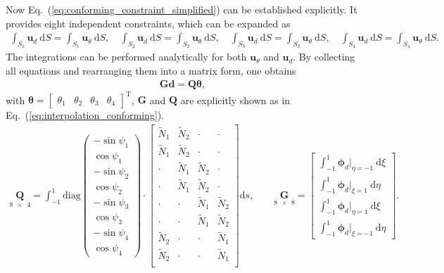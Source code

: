 \documentclass[3p,sort&compress,review,11pt]{elsarticle}
\newcommand*{\md}[1]{\mathrm{d}#1}
\newcommand*{\mT}{\mathrm{T}}
\newcommand*{\eqsref}[1]{Eq.~(\ref{#1})}
\begin{document}
Now \eqsref{eq:conforming_constraint_simplified} can be established explicitly. It provides eight independent constraints, which can be expanded as
\begin{gather*}
\int_{S_1}\mathbold{u}_d~\md{S}=\int_{S_1}\mathbold{u}_\theta~\md{S},\quad
\int_{S_2}\mathbold{u}_d~\md{S}=\int_{S_2}\mathbold{u}_\theta~\md{S},\quad
\int_{S_3}\mathbold{u}_d~\md{S}=\int_{S_3}\mathbold{u}_\theta~\md{S},\quad
\int_{S_4}\mathbold{u}_d~\md{S}=\int_{S_4}\mathbold{u}_\theta~\md{S}.
\end{gather*}
The integrations can be performed analytically for both $\mathbold{u}_\theta$ and $\mathbold{u}_d$. By collecting all equations and rearranging them into a matrix form, one obtains
\begin{gather}
\mathbold{G}\mathbold{d}=\mathbold{Q}\mathbold{\theta},
\end{gather}
with $\mathbold{\theta}=\begin{bmatrix}\theta_1&\theta_2&\theta_3&\theta_4\end{bmatrix}^\mT$, $\mathbold{G}$ and $\mathbold{Q}$ are explicitly shown as in \eqsref{eq:interpolation_conforming}.
\begin{gather}\label{eq:interpolation_conforming}
\underset{\num{8x4}}{\mathbold{Q}}=\int_{-1}^{1}\text{diag}\begin{pmatrix}
-\sin\psi_1\\\cos\psi_1\\-\sin\psi_2\\\cos\psi_2\\-\sin\psi_3\\\cos\psi_3\\-\sin\psi_4\\\cos\psi_4
\end{pmatrix}\cdot\begin{bmatrix}
\tilde{N}_1&\tilde{N}_2&\cdot&\cdot\\
\tilde{N}_1&\tilde{N}_2&\cdot&\cdot\\
\cdot&\tilde{N}_1&\tilde{N}_2&\cdot\\
\cdot&\tilde{N}_1&\tilde{N}_2&\cdot\\
\cdot&\cdot&\tilde{N}_1&\tilde{N}_2\\
\cdot&\cdot&\tilde{N}_1&\tilde{N}_2\\
\tilde{N}_2&\cdot&\cdot&\tilde{N}_1\\
\tilde{N}_2&\cdot&\cdot&\tilde{N}_1\\
\end{bmatrix}\md{s},\qquad
\underset{\num{8x8}}{\mathbold{G}}=\begin{bmatrix}
\displaystyle\int_{-1}^{1}\mathbold{\phi}_d\Big|_{\eta=-1}~\md{\xi}\\[3mm]
\displaystyle\int_{-1}^{1}\mathbold{\phi}_d\Big|_{\xi=1}~\md{\eta}\\[3mm]
\displaystyle\int_{-1}^{1}\mathbold{\phi}_d\Big|_{\eta=1}~\md{\xi}\\[3mm]
\displaystyle\int_{-1}^{1}\mathbold{\phi}_d\Big|_{\xi=-1}~\md{\eta}
\end{bmatrix}.
\end{gather}
\end{document}
